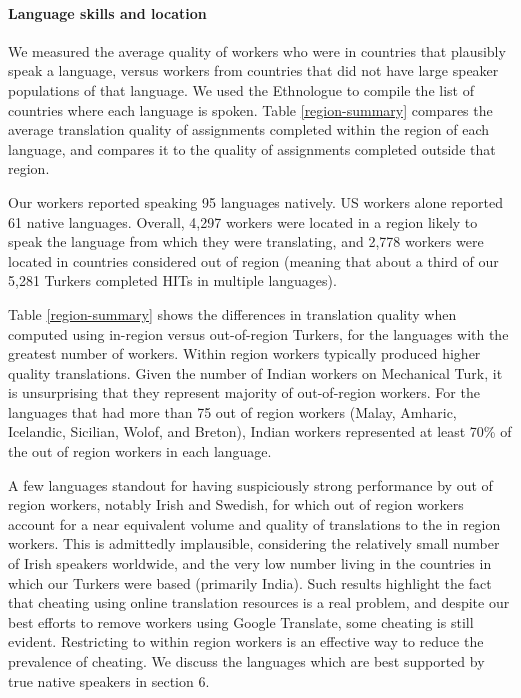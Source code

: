 \documentclass[11pt]{article}
\begin{document}
\paragraph{Language skills and location}

We measured the average quality of workers who were in countries that plausibly speak a language, versus workers from countries that did not have large speaker populations of that language.  We used the Ethnologue \cite{ethnologue} to compile the list of countries where each language is spoken.  Table \ref{region-summary} compares the average translation quality of assignments completed within the region of each language, and compares it to the quality of assignments completed outside that region. 

Our workers reported speaking 95 languages natively. US workers alone reported 61 native languages. Overall, 4,297 workers were located in a region likely to speak the language from which they were translating, and 2,778 workers were located in countries considered out of region (meaning that about a third of our 5,281 Turkers completed HITs in multiple languages). 

Table \ref{region-summary} shows the differences in translation quality when computed using in-region versus out-of-region Turkers, for the languages with the greatest number of workers.  Within region workers typically produced higher quality translations. Given the number of Indian workers on Mechanical Turk, it is unsurprising that they represent majority of out-of-region workers.  For the languages that had more than 75 out of region workers (Malay, Amharic, Icelandic, Sicilian, Wolof, and Breton), Indian workers represented at least 70\% of the out of region workers in each language.

A few languages standout for having suspiciously strong performance by out of region workers, notably Irish and Swedish, for which out of region workers account for a near equivalent volume and quality of translations to the in region workers. This is admittedly implausible, considering the relatively small number of Irish speakers worldwide, and the very low number living in the countries in which our Turkers were based (primarily India). Such results highlight the fact that cheating using online translation resources is a real problem, and despite our best efforts to remove workers using Google Translate, some cheating is still evident. Restricting to within region workers is an effective way to reduce the prevalence of cheating. We discuss the languages which are best supported by true native speakers in section 6. 
\end{document}
